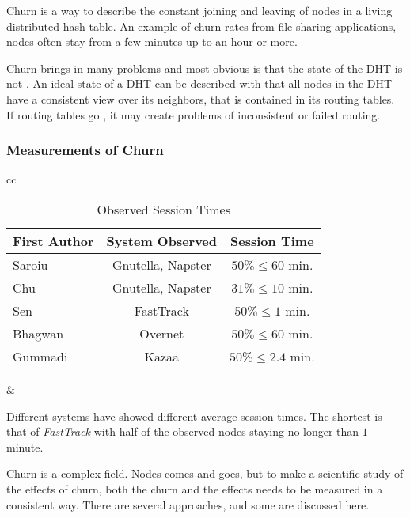 Churn is a way to describe the constant joining and leaving of nodes in a living
 distributed hash table. An example of churn rates from file sharing applications,
 nodes often stay from a few minutes up to an hour or more\cite{rhea-04-handling-churn}.

Churn brings in many problems and most obvious is that the state of the DHT is not
 \cite{liben-nowell-02-observations}. An ideal state of a DHT can be
 described with that all nodes in the DHT have a consistent view over its neighbors,
 that is contained in its routing tables. If routing tables go ,
 it may create problems of inconsistent or failed routing.

\subsubsection{Measurements of Churn}

\begin{table}[htp]
\centering
\begin{tabular}{cc}

\begin{tabular}{l|c|c}
First Author & System Observed   & Session Time \\ \hline
Saroiu       & Gnutella, Napster & $50\%\leq60$ min.  \\
Chu          & Gnutella, Napster & $31\%\leq10$ min.  \\
Sen          & FastTrack         & $50\%\leq 1$ min.  \\
Bhagwan      & Overnet           & $50\%\leq60$ min.  \\
Gummadi      & Kazaa             & $50\%\leq2.4$ min. \\
\end{tabular}

&

\parbox{.34\linewidth}{\small
  Different systems have showed different average session
   times. The shortest is that of \emph{FastTrack} with half of the
   observed nodes staying no longer than $1$
   minute\cite{rhea-04-handling-churn}.

}
\end{tabular}

\caption{Observed Session Times}
\end{table}

Churn is a complex field. Nodes comes and goes, but to make a scientific study of the
 effects of churn, both the churn and the effects needs to be measured in a
 consistent way. There are several approaches, and some are discussed here.

